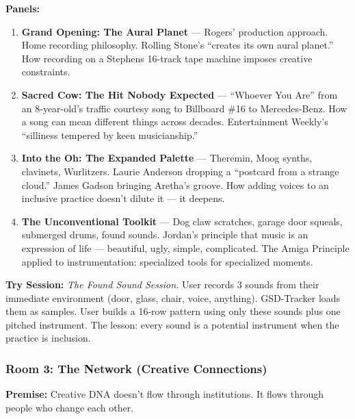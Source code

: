 \documentclass[11pt,letterpaper]{article}
\begin{document}
\textbf{Panels:}
\begin{enumerate}[leftmargin=2em]
\item \textbf{Grand Opening: The Aural Planet} --- Rogers' production approach. Home recording philosophy. Rolling Stone's ``creates its own aural planet.'' How recording on a Stephens 16-track tape machine imposes creative constraints.
\item \textbf{Sacred Cow: The Hit Nobody Expected} --- ``Whoever You Are'' from an 8-year-old's traffic courtesy song to Billboard \#16 to Mercedes-Benz. How a song can mean different things across decades. Entertainment Weekly's ``silliness tempered by keen musicianship.''
\item \textbf{Into the Oh: The Expanded Palette} --- Theremin, Moog synths, clavinets, Wurlitzers. Laurie Anderson dropping a ``postcard from a strange cloud.'' James Gadson bringing Aretha's groove. How adding voices to an inclusive practice doesn't dilute it --- it deepens.
\item \textbf{The Unconventional Toolkit} --- Dog claw scratches, garage door squeals, submerged drums, found sounds. Jordan's principle that music is an expression of life --- beautiful, ugly, simple, complicated. The Amiga Principle applied to instrumentation: specialized tools for specialized moments.
\end{enumerate}

\textbf{Try Session:} \textit{The Found Sound Session.} User records 3 sounds from their immediate environment (door, glass, chair, voice, anything). GSD-Tracker loads them as samples. User builds a 16-row pattern using only these sounds plus one pitched instrument. The lesson: every sound is a potential instrument when the practice is inclusion.

\subsubsection{Room 3: The Network (Creative Connections)}

\textbf{Premise:} Creative DNA doesn't flow through institutions. It flows through people who change each other.
\end{document}
